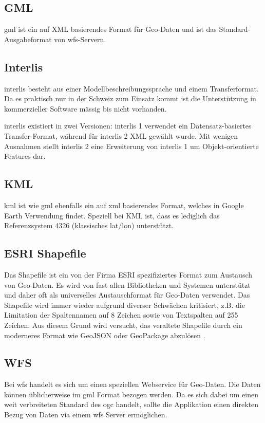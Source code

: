 \subsection{GML}
\gls{gml} ist ein auf XML basierendes Format für Geo-Daten und ist das Standard-Ausgabeformat von \acs{wfs}-Servern.


\subsection{Interlis}
\gls{interlis} besteht aus einer Modellbeschreibungssprache und einem Transferformat. Da es praktisch nur in der Schweiz zum Einsatz kommt ist die Unterstützung in kommerzieller Software mässig bis nicht vorhanden.

\gls{interlis} existiert in zwei Versionen: \gls{interlis} 1 verwendet ein Datensatz-basiertes Transfer-Format, während für \gls{interlis} 2 XML gewählt wurde. Mit wenigen Ausnahmen stellt \gls{interlis} 2 eine Erweiterung von \gls{interlis} 1 um Objekt-orientierte Features dar.

\subsection{KML}
\gls{kml} ist wie \gls{gml} ebenfalls ein auf \acs{xml} basierendes Format, welches in Google Earth Verwendung findet. Speziell bei KML ist, dass es lediglich das Referenzsystem 4326 (klassisches lat/lon) unterstützt.


\subsection{ESRI Shapefile}
Das Shapefile ist ein von der Firma ESRI spezifiziertes Format zum Austausch von Geo-Daten. Es wird von fast allen Bibliotheken und Systemen unterstützt und daher oft als universelles Austauschformat für Geo-Daten verwendet. Das Shapefile wird immer wieder aufgrund diverser Schwächen kritisiert, z.B. die Limitation der Spaltennamen auf 8 Zeichen sowie von Textspalten auf 255 Zeichen. Aus diesem Grund wird versucht, das veraltete Shapefile durch ein moderneres Format wie GeoJSON oder GeoPackage abzulösen \cite{sfkeller}.

\subsection{WFS}
Bei \gls{wfs} handelt es sich um einen speziellen Webservice für Geo-Daten. Die Daten können üblicherweise im \gls{gml} Format bezogen werden. Da es sich dabei um einen weit verbreiteten Standard des \gls{ogc} handelt, sollte die Applikation einen direkten Bezug von Daten via einem \acs{wfs} Server ermöglichen.

